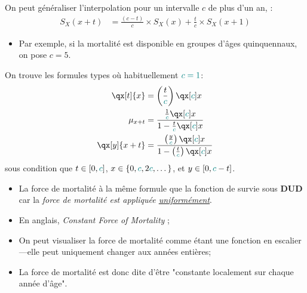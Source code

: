 \documentclass[10pt, french]{article}
\begin{document}
\begin{multicols*}{3}
\begin{definitionNOHFILL}
On peut généraliser l'interpolation pour un intervalle $c$ de plus d'un an,  :
\begin{align*}
	S_{X}(x + t) 
	&=	\frac{(c - t)}{c} \times S_X(x) + \frac{t}{c} \times S_X(x + 1)	
\end{align*}
\begin{itemize}[leftmargin = *]
	\item	Par exemple, si la mortalité est disponible en groupes d'âges quinquennaux, on pose $c = 5$.
\end{itemize}
\end{definitionNOHFILL}

On trouve les formules types où habituellement $\textcolor{teal}{c = 1}$:
\begin{align*}
	\qx[t]{x} 
	&=	\left(\frac{t}{\textcolor{teal}{c}}\right) \qx[\textcolor{teal}{c}]{x}	\\
	\mu_{x + t} 
	&=	\frac{\frac{1}{\textcolor{teal}{c}} \qx[\textcolor{teal}{c}]{x}}{1 - \frac{t}{\textcolor{teal}{c}} \qx[\textcolor{teal}{c}]{x}}	\\
	\qx[y]{x + t} 
	&=	\frac{\left(\frac{y}{\textcolor{teal}{c}}\right) \qx[\textcolor{teal}{c}]{x}}{1 -\left(\frac{t}{\textcolor{teal}{c}}\right) \qx[\textcolor{teal}{c}]{x}}
\end{align*}
sous condition que $t \in [0, \textcolor{teal}{c}]$, $x \in \{0, \textcolor{teal}{c}, 2\textcolor{teal}{c}, \dots\}$, et $y \in [0, \textcolor{teal}{c} - t]$.

\begin{itemize}[leftmargin = *]
	\item	La force de mortalité à la même formule que la fonction de survie sous \textbf{DUD} car la \textit{force de mortalité est appliquée \underline{uniformément}}.
\end{itemize}

\begin{definitionNOHFILL}
\begin{itemize}[leftmargin = *]
	\item	En anglais, \og \textit{Constant Force of Mortality} \fg{};
	\item	On peut visualiser la force de mortalité comme étant une fonction en escalier---elle peut uniquement changer aux années entières;
	\item	La force de mortalité est donc dite d'être "constante localement sur chaque année d'âge".
\end{itemize}


\end{definitionNOHFILL}
\end{multicols*}
\end{document}
